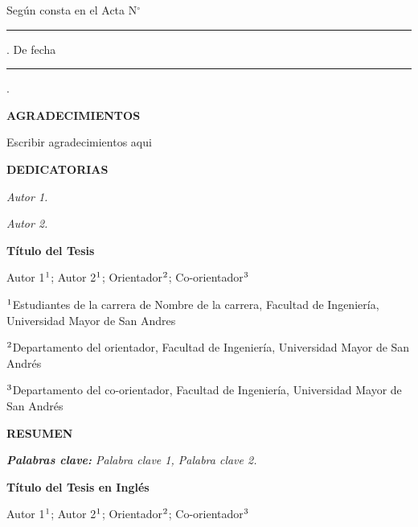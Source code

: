 \documentclass[11pt,oneside,a4paper]{book}
\begin{document}
Según consta en el Acta N$^{\circ}$ \rule{2cm}{1pt}. De fecha \rule{2cm}{1pt}.


\newpage
\thispagestyle{plain}
\begin{center}
\textbf{AGRADECIMIENTOS}
\end{center}
\vspace{1cm}

Escribir agradecimientos aqui\\

\lipsum[1]

\newpage
\thispagestyle{plain}
\begin{center}
\textbf{DEDICATORIAS}
\end{center}
\vspace{1cm}

\lipsum[1]

\hfill \textit{Autor 1.}

\lipsum[2]

\hfill \textit{Autor 2.}

\newpage
\thispagestyle{plain}
\large
\begin{center}
\textbf{{Título del Tesis}}
\end{center}

\begin{center}
Autor 1$^{\textnormal{1}}$; Autor 2$^{\textnormal{1}}$; Orientador$^{\textnormal{2}}$; Co-orientador$^{\textnormal{3}}$
\end{center}


$^{\textnormal{1}}$Estudiantes de la carrera de Nombre de la carrera, Facultad de Ingeniería, Universidad Mayor de San Andres

$^{\textnormal{2}}$Departamento del orientador, Facultad de Ingeniería, Universidad Mayor de San Andrés

$^{\textnormal{3}}$Departamento del co-orientador, Facultad de Ingeniería, Universidad Mayor de San Andrés



\begin{center}
    \textbf{RESUMEN}
\end{center}


\noindent 
\lipsum[1]


\textit{\textbf{Palabras clave:} Palabra clave 1, Palabra clave 2.}


\newpage
\thispagestyle{plain}
\begin{center}
\large{\textbf{Título del Tesis en Inglés}}\\
\end{center}
\large
\begin{center}
Autor 1$^{\textnormal{1}}$; Autor 2$^{\textnormal{1}}$; Orientador$^{\textnormal{2}}$; Co-orientador$^{\textnormal{3}}$
\end{center}
\end{document}
